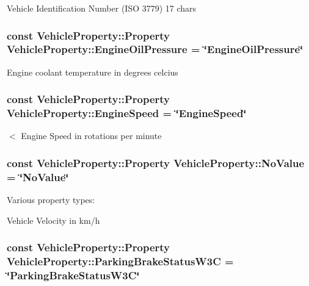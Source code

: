 Vehicle Identification Number (I\+S\+O 3779) 17 chars \hypertarget{classVehicleProperty_ab7fad273c7149dbd338f53f2536aca26}{
\subsubsection[{Engine\+Oil\+Pressure}]{\setlength{\rightskip}{0pt plus 5cm}const Vehicle\+Property\+::\+Property Vehicle\+Property\+::\+Engine\+Oil\+Pressure = \char`\"{}Engine\+Oil\+Pressure\char`\"{}\hspace{0.3cm}{\ttfamily [static]}}}\label{classVehicleProperty_ab7fad273c7149dbd338f53f2536aca26}
Engine coolant temperature in degrees celcius \hypertarget{classVehicleProperty_a7949fe3d031814fc2644de14f8cec9a0}{
\subsubsection[{Engine\+Speed}]{\setlength{\rightskip}{0pt plus 5cm}const Vehicle\+Property\+::\+Property Vehicle\+Property\+::\+Engine\+Speed = \char`\"{}Engine\+Speed\char`\"{}\hspace{0.3cm}{\ttfamily [static]}}}\label{classVehicleProperty_a7949fe3d031814fc2644de14f8cec9a0}
$<$ Engine Speed in rotations per minute \hypertarget{classVehicleProperty_ae013e9c1f3fb57d646211d3e6bb4ca9e}{
\subsubsection[{No\+Value}]{\setlength{\rightskip}{0pt plus 5cm}const Vehicle\+Property\+::\+Property Vehicle\+Property\+::\+No\+Value = \char`\"{}No\+Value\char`\"{}\hspace{0.3cm}{\ttfamily [static]}}}\label{classVehicleProperty_ae013e9c1f3fb57d646211d3e6bb4ca9e}


Various property types\+: 

Vehicle Velocity in km/h \hypertarget{classVehicleProperty_a7a0b961463207e9cb2f57e7c1061f7ae}{
\subsubsection[{Parking\+Brake\+Status\+W3\+C}]{\setlength{\rightskip}{0pt plus 5cm}const Vehicle\+Property\+::\+Property Vehicle\+Property\+::\+Parking\+Brake\+Status\+W3\+C = \char`\"{}Parking\+Brake\+Status\+W3\+C\char`\"{}\hspace{0.3cm}{\ttfamily [static]}}}\label{classVehicleProperty_a7a0b961463207e9cb2f57e7c1061f7ae}


